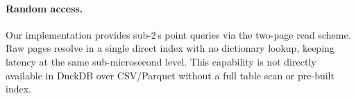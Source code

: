\documentclass[a4paper,11pt]{article}
\begin{document}
\paragraph{Random access.}
Our implementation provides sub-2\,\textmu{}s point queries via the
two-page read scheme. Raw pages resolve in a single direct index with no
dictionary lookup, keeping latency at the same sub-microsecond level.
This capability is not directly available in DuckDB over CSV/Parquet
without a full table scan or pre-built index.
\end{document}
